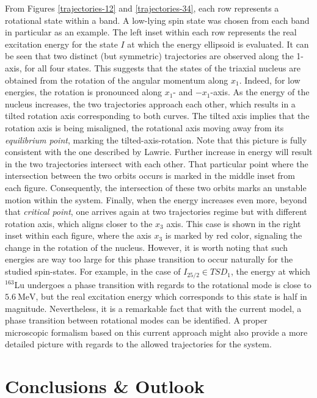 \documentclass[11pt]{article}
\begin{document}
From Figures \ref{trajectories-12} and \ref{trajectories-34}, each row represents a rotational state within a band. A low-lying spin state was chosen from each band in particular as an example. The left inset within each row represents the real excitation energy for the state $I$ at which the energy ellipsoid is evaluated. It can be seen that two distinct (but symmetric) trajectories are observed along the 1-axis, for all four states. This suggests that the states of the triaxial nucleus are obtained from the rotation of the angular momentum along $x_1$. Indeed, for low energies, the rotation is pronounced along $x_1$- and $-x_1$-axis. As the energy of the nucleus increases, the two trajectories approach each other, which results in a tilted rotation axis corresponding to both curves. The tilted axis implies that the rotation axis is being misaligned, the rotational axis moving away from its \emph{equilibrium point}, marking the tilted-axis-rotation. Note that this picture is fully consistent with the one described by Lawrie. Further increase in energy will result in the two trajectories intersect with each other. That particular point where the intersection between the two orbits occurs is marked in the middle inset from each figure. Consequently, the intersection of these two orbits marks an unstable motion within the system. Finally, when the energy increases even more, beyond that \emph{critical point}, one arrives again at two trajectories regime but with different rotation axis, which aligns closer to the $x_3$ axis. This case is shown in the right inset within each figure, where the axis $x_3$ is marked by red color, signaling the change in the rotation of the nucleus. However, it is worth noting that such energies are way too large for this phase transition to occur naturally for the studied spin-states. For example, in the case of $I_{25/2}\in TSD_1$, the energy at which $^{163}$Lu undergoes a phase transition with regards to the rotational mode is close to $5.6\ \text{MeV}$, but the real excitation energy which corresponds to this state is half in magnitude. Nevertheless, it is a remarkable fact that with the current model, a phase transition between rotational modes can be identified. A proper microscopic formalism based on this current approach might also provide a more detailed picture with regards to the allowed trajectories for the system.

\section{Conclusions \& Outlook}
\end{document}
